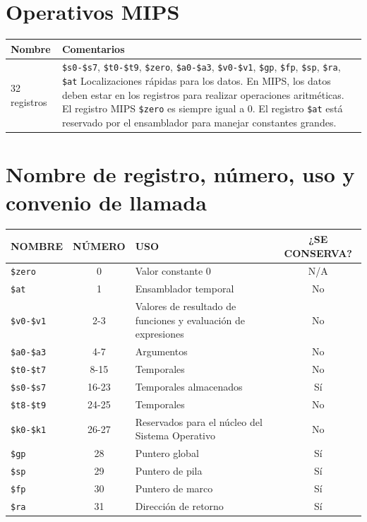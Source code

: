 \documentclass[12pt,a4paper]{article}
\begin{document}
	\section*{Operativos MIPS}
	
	\begin{table}[H]
		\centering
		\begin{tabularx}{\textwidth}{l X}
			\toprule
			\textbf{Nombre} & \textbf{Comentarios} \\
			\midrule
			32 registros & \texttt{\$s0-\$s7}, \texttt{\$t0-\$t9}, \texttt{\$zero}, \texttt{\$a0-\$a3}, \texttt{\$v0-\$v1}, \texttt{\$gp}, \texttt{\$fp}, \texttt{\$sp}, \texttt{\$ra}, \texttt{\$at} \newline Localizaciones rápidas para los datos. En MIPS, los datos deben estar en los registros para realizar operaciones aritméticas. El registro MIPS \texttt{\$zero} es siempre igual a 0. El registro \texttt{\$at} está reservado por el ensamblador para manejar constantes grandes. \\
			\bottomrule
		\end{tabularx}
	\end{table}
	
	\section*{Nombre de registro, número, uso y convenio de llamada}
	
	\begin{table}[H]
		\centering
		\small
		\begin{tabularx}{\textwidth}{l c X c}
			\toprule
			\textbf{NOMBRE} & \textbf{NÚMERO} & \textbf{USO} & \textbf{¿SE CONSERVA?} \\
			\midrule
			\texttt{\$zero} & 0 & Valor constante 0 & N/A \\
			\texttt{\$at} & 1 & Ensamblador temporal & No \\
			\texttt{\$v0-\$v1} & 2-3 & Valores de resultado de funciones y evaluación de expresiones & No \\
			\texttt{\$a0-\$a3} & 4-7 & Argumentos & No \\
			\texttt{\$t0-\$t7} & 8-15 & Temporales & No \\
			\texttt{\$s0-\$s7} & 16-23 & Temporales almacenados & Sí \\
			\texttt{\$t8-\$t9} & 24-25 & Temporales & No \\
			\texttt{\$k0-\$k1} & 26-27 & Reservados para el núcleo del Sistema Operativo & No \\
			\texttt{\$gp} & 28 & Puntero global & Sí \\
			\texttt{\$sp} & 29 & Puntero de pila & Sí \\
			\texttt{\$fp} & 30 & Puntero de marco & Sí \\
			\texttt{\$ra} & 31 & Dirección de retorno & Sí \\
			\bottomrule
		\end{tabularx}
	\end{table}
	
\end{document}
